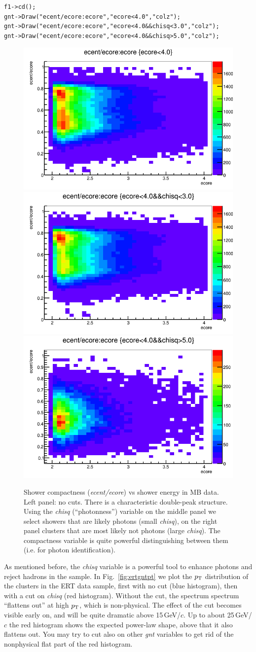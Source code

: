 \documentclass[12pt,letterpaper,aps,prc,superscriptaddress,showpacs,
longbibliography,nofootinbib,floatfix,onecolumn]{revtex4-1}
\newcommand{\pt}{\mbox{$p_{\rm T}$}\xspace}
\newcommand{\gevc}{\mbox{GeV/$c$}\xspace}
\begin{document}
\begin{verbatim}
f1->cd();
gnt->Draw("ecent/ecore:ecore","ecore<4.0","colz");
gnt->Draw("ecent/ecore:ecore","ecore<4.0&&chisq<3.0","colz");
gnt->Draw("ecent/ecore:ecore","ecore<4.0&&chisq>5.0","colz");
\end{verbatim}



\begin{center}
\begin{figure}[htbp]
  \includegraphics[width=0.3\linewidth]{figs/mbcentcore_nocut.png}
  \includegraphics[width=0.3\linewidth]{figs/mbcentcore_chilt3.png}
  \includegraphics[width=0.3\linewidth]{figs/mbcentcore_chigt5.png}
  \caption{Shower compactness ({\it ecent/ecore}) vs shower energy in
    MB data.  Left panel: no cuts.  There is a characteristic
    double-peak structure.  Using the {\it chisq} (``photonness'')
    variable on the middle panel we select showers that are likely
    photons (small {\it chisq}), 
    on the right panel clusters that are most likely not
    photons (large {\it chisq}).  The compactness variable is quite powerful
    distinguishing between them (i.e. for photon identification).
  }
    \label{fig:ecentecore}
\end{figure}
\end{center}

As mentioned before, the {\it chisq} variable is a powerful tool to
enhance photons and reject hadrons in the sample.  In 
Fig.~\ref{fig:ertgntpt} we plot the \pt distribution of the clusters
in the ERT data sample, first with no cut (blue histogram), then with
a cut on {\it chisq} (red histogram).  Without the cut, the spectrum
spectrum ``flattens out'' at high \pt, which is non-physical.  The
effect of the cut becomes visible early on, and will be quite dramatic
above 15\,\gevc.  Up to about 25\,\gevc the red histogram shows the
expected power-law shape, above that it also flattens out.  You may
try to cut also on other {\it gnt} variables to get rid of the
nonphysical flat part of the red histogram.
\end{document}
